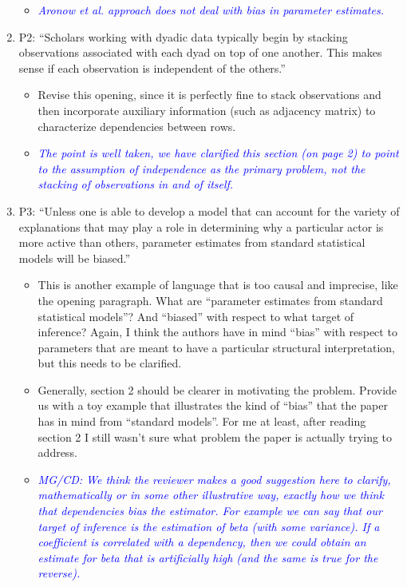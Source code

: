 \begin{enumerate}
\begin{itemize}
{{		}}
		\item \textcolor{blue}{ \emph{
		Aronow et al. approach does not deal with bias in parameter estimates.
		}}
	\end{itemize}
	\item P2: “Scholars working with dyadic data typically begin by stacking observations associated with each dyad on top of one another. This makes sense if each observation is independent of the others.”
	\begin{itemize}
		\item Revise this opening, since it is perfectly fine to stack observations and then incorporate auxiliary information (such as adjacency matrix) to characterize dependencies between rows.
	\end{itemize}
	\begin{itemize}
		\item \textcolor{blue}{ \emph{
		 The point is well taken, we have clarified this section (on page 2) to point to the assumption of independence as the primary problem, not the stacking of observations in and of itself.
		}}
	\end{itemize}
	\item P3: “Unless one is able to develop a model that can account for the variety of explanations that may play a role in determining why a particular actor is more active than others, parameter estimates from standard statistical models will be biased.”
	\begin{itemize}
		\item This is another example of language that is too causal and imprecise, like the opening paragraph. What are “parameter estimates from standard statistical models”?  And “biased” with respect to what target of inference? Again, I think the authors have in mind “bias” with respect to parameters that are meant to have a particular structural interpretation, but this needs to be clarified.
		\item Generally, section 2 should be clearer in motivating the problem.  Provide us with a toy example that illustrates the kind of “bias” that the paper has in mind from “standard models”.  For me at least, after reading section 2 I still wasn’t sure what problem the paper is actually trying to address.
		\item \textcolor{blue}{ \emph{ MG/CD: We think the reviewer makes a good suggestion here to clarify, mathematically or in some other illustrative way, exactly how we think that dependencies bias the estimator. For example we can say that our target of inference is the estimation of beta (with some variance). If a coefficient is correlated with a dependency, then we could obtain an estimate for beta that is artificially high (and the same is true for the reverse).}}

\end{itemize}
\end{enumerate}
